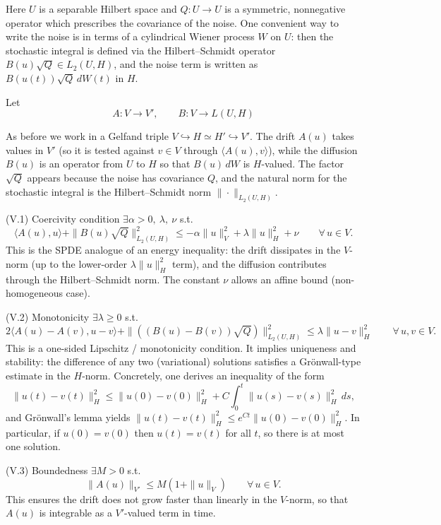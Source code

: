 \documentclass[11pt]{article}
\theoremstyle{definition}
\theoremstyle{remark}
\begin{document}
\medskip
\noindent
Here \(U\) is a separable Hilbert space and \(Q:U\to U\) is a symmetric, nonnegative operator which prescribes the covariance of the noise.
One convenient way to write the noise is in terms of a cylindrical Wiener process \(W\) on \(U\): then the stochastic integral is defined via the Hilbert--Schmidt operator \(B(u)\sqrt{Q}\in L_{2}(U,H)\), and the noise term is written as \(B(u(t))\sqrt{Q}\,dW(t)\) in \(H\).

\medskip
\noindent
Let
\[
A:V\to V',
\qquad
B:V\to L(U,H)
\]

\medskip
\noindent
As before we work in a Gelfand triple \(V\hookrightarrow H\simeq H'\hookrightarrow V'\).
The drift \(A(u)\) takes values in \(V'\) (so it is tested against \(v\in V\) through \(\langle A(u),v\rangle\)), while the diffusion \(B(u)\) is an operator from \(U\) to \(H\) so that \(B(u)\,dW\) is \(H\)-valued.
The factor \(\sqrt{Q}\) appears because the noise has covariance \(Q\), and the natural norm for the stochastic integral is the Hilbert--Schmidt norm \(\|\cdot\|_{L_{2}(U,H)}\).

\medskip
\noindent
(V.1) Coercivity condition \(\exists \alpha>0,\ \lambda,\ \nu\) s.t.
\[
\langle A(u),u\rangle+\|B(u)\sqrt{Q}\|_{L_{2}(U,H)}^{2}\le -\alpha\|u\|_{V}^{2}+\lambda\|u\|_{H}^{2}+\nu
\qquad \forall\,u\in V.
\]
\medskip
\noindent
This is the SPDE analogue of an energy inequality: the drift dissipates in the \(V\)-norm (up to the lower-order \(\lambda\|u\|_{H}^{2}\) term), and the diffusion contributes through the Hilbert--Schmidt norm.
The constant \(\nu\) allows an affine bound (non-homogeneous case).

\medskip
\noindent
(V.2) Monotonicity \(\exists \lambda\ge 0\) s.t.
\[
2\langle A(u)-A(v),u-v\rangle+\|((B(u)-B(v))\sqrt{Q})\|_{L_{2}(U,H)}^{2}\le \lambda\|u-v\|_{H}^{2}
\qquad \forall\,u,v\in V.
\]
\medskip
\noindent
This is a one-sided Lipschitz / monotonicity condition.
It implies uniqueness and stability: the difference of any two (variational) solutions satisfies a Gr\"onwall-type estimate in the \(H\)-norm. Concretely, one derives an inequality of the form
\[
\|u(t)-v(t)\|_{H}^{2}\le \|u(0)-v(0)\|_{H}^{2}+C\int_{0}^{t}\|u(s)-v(s)\|_{H}^{2}\,ds,
\]
and Gr\"onwall's lemma yields \(\|u(t)-v(t)\|_{H}^{2}\le e^{Ct}\|u(0)-v(0)\|_{H}^{2}\). In particular, if \(u(0)=v(0)\) then \(u(t)=v(t)\) for all \(t\), so there is at most one solution.

\medskip
\noindent
(V.3) Boundedness \(\exists M>0\) s.t.
\[
\|A(u)\|_{V'}\le M(1+\|u\|_{V})
\qquad \forall\,u\in V.
\]
\medskip
\noindent
This ensures the drift does not grow faster than linearly in the \(V\)-norm, so that \(A(u)\) is integrable as a \(V'\)-valued term in time.
\end{document}
